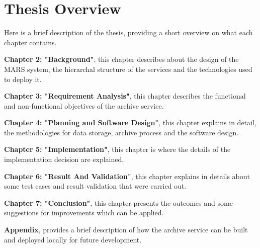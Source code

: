 
    \newpage
    \section{Thesis Overview} 
        Here is a brief description of the thesis, providing a short overview on what each
        chapter contains.
        
        \par
        \textbf{Chapter 2: "Background"}, this chapter describes about the design
        of the MARS system, the hierarchal structure of the services and the technologies used to
        deploy it.

        \par
        \textbf{Chapter 3: "Requirement Analysis"}, this chapter describes the functional and
        non-functional objectives of the archive service.

        \par
        \textbf{Chapter 4: "Planning and Software Design"}, this chapter explains in detail, the 
        methodologies for data storage, archive process and the software design.

        \par
        \textbf{Chapter 5: "Implementation"}, this chapter is where the details of the 
        implementation decision are explained.

        \par
        \textbf{Chapter 6: "Result And Validation"}, this chapter explains in details about 
        some test cases and result validation that were carried out.

        \par
        \textbf{Chapter 7: "Conclusion"}, this chapter presents the outcomes and some 
        suggestions for improvements which can be applied.
        
        \textbf{Appendix}, provides a brief description of how the archive service can be built and deployed locally for future development.

